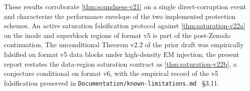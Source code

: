 These results corroborate \cref{thm:soundness-v21} on a single
direct-corruption event and characterize the performance envelope
of the two implemented protection schemes. An active saturation
falsification protocol against \cref{thm:saturation-v22a} on the
inode and superblock regions of format v5 is part of the
post-Zenodo continuation. The unconditional Theorem v2.2 of the
prior draft was empirically falsified on format v5 data blocks
under high-density EM injection; the present report restates the
data-region saturation contract as \cref{thm:saturation-v22b}, a
conjecture conditional on format v6, with the empirical record of
the v5 falsification preserved in
\texttt{Documentation/known-limitations.md}~\cite{beamfs-impl}
\S3.11.
